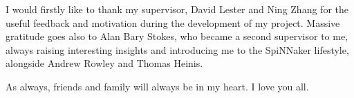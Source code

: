 { \par}
\vspace{5mm}
I would firstly like to thank my supervisor, David Lester and Ning Zhang for the useful feedback and motivation during the development of my project. Massive gratitude goes also to Alan Bary Stokes, who became a second supervisor to me, always raising interesting insights and introducing me to the SpiNNaker lifestyle, alongside Andrew Rowley and Thomas Heinis.

As always, friends and family will always be in my heart. I love you all.